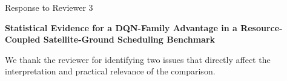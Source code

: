 

\begin{center}
{\Large Response to Reviewer 3}\par
\medskip
{\bfseries Statistical Evidence for a DQN-Family Advantage in a Resource-Coupled Satellite-Ground Scheduling Benchmark}
\end{center}

We thank the reviewer for identifying two issues that directly affect the interpretation and practical relevance of the comparison.




